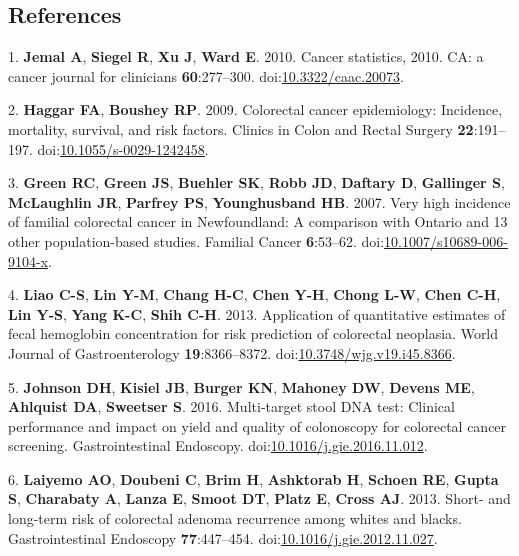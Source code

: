 \documentclass[12pt,]{article}
\begin{document}
\newpage

\subsection*{References}\label{references}

\hypertarget{refs}{}
\hypertarget{ref-jemal_cancer_2010}{}
1. \textbf{Jemal A}, \textbf{Siegel R}, \textbf{Xu J}, \textbf{Ward E}.
2010. Cancer statistics, 2010. CA: a cancer journal for clinicians
\textbf{60}:277--300.
doi:\href{https://doi.org/10.3322/caac.20073}{10.3322/caac.20073}.

\hypertarget{ref-haggar_colorectal_2009}{}
2. \textbf{Haggar FA}, \textbf{Boushey RP}. 2009. Colorectal cancer
epidemiology: Incidence, mortality, survival, and risk factors. Clinics
in Colon and Rectal Surgery \textbf{22}:191--197.
doi:\href{https://doi.org/10.1055/s-0029-1242458}{10.1055/s-0029-1242458}.

\hypertarget{ref-green_very_2007}{}
3. \textbf{Green RC}, \textbf{Green JS}, \textbf{Buehler SK},
\textbf{Robb JD}, \textbf{Daftary D}, \textbf{Gallinger S},
\textbf{McLaughlin JR}, \textbf{Parfrey PS}, \textbf{Younghusband HB}.
2007. Very high incidence of familial colorectal cancer in Newfoundland:
A comparison with Ontario and 13 other population-based studies.
Familial Cancer \textbf{6}:53--62.
doi:\href{https://doi.org/10.1007/s10689-006-9104-x}{10.1007/s10689-006-9104-x}.

\hypertarget{ref-liao_application_2013}{}
4. \textbf{Liao C-S}, \textbf{Lin Y-M}, \textbf{Chang H-C}, \textbf{Chen
Y-H}, \textbf{Chong L-W}, \textbf{Chen C-H}, \textbf{Lin Y-S},
\textbf{Yang K-C}, \textbf{Shih C-H}. 2013. Application of quantitative
estimates of fecal hemoglobin concentration for risk prediction of
colorectal neoplasia. World Journal of Gastroenterology
\textbf{19}:8366--8372.
doi:\href{https://doi.org/10.3748/wjg.v19.i45.8366}{10.3748/wjg.v19.i45.8366}.

\hypertarget{ref-johnson_multi-target_2016}{}
5. \textbf{Johnson DH}, \textbf{Kisiel JB}, \textbf{Burger KN},
\textbf{Mahoney DW}, \textbf{Devens ME}, \textbf{Ahlquist DA},
\textbf{Sweetser S}. 2016. Multi-target stool DNA test: Clinical
performance and impact on yield and quality of colonoscopy for
colorectal cancer screening. Gastrointestinal Endoscopy.
doi:\href{https://doi.org/10.1016/j.gie.2016.11.012}{10.1016/j.gie.2016.11.012}.

\hypertarget{ref-laiyemo_short-_2013}{}
6. \textbf{Laiyemo AO}, \textbf{Doubeni C}, \textbf{Brim H},
\textbf{Ashktorab H}, \textbf{Schoen RE}, \textbf{Gupta S},
\textbf{Charabaty A}, \textbf{Lanza E}, \textbf{Smoot DT}, \textbf{Platz
E}, \textbf{Cross AJ}. 2013. Short- and long-term risk of colorectal
adenoma recurrence among whites and blacks. Gastrointestinal Endoscopy
\textbf{77}:447--454.
doi:\href{https://doi.org/10.1016/j.gie.2012.11.027}{10.1016/j.gie.2012.11.027}.
\end{document}
